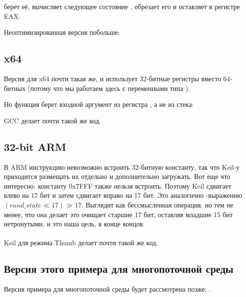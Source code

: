  берет её, вычисляет следующее состояние , 
обрезает его и оставляет в регистре EAX.

Неоптимизированная версия побольше:



\subsection{x64}

Версия для x64 почти такая же, и использует 32-битные регистры вместо 64-битных
(потому что мы работаем здесь с переменными типа \Tint).

Но функция  берет входной аргумент из регистра \ECX, а не из стека:



GCC делает почти такой же код.

\subsection{32-bit ARM}



В ARM инструкцию невозможно встроить 32-битную константу, так что Keil-у приходится размещать их отдельно и дополнительно загружать.
Вот еще что интересно: константу 0x7FFF также нельзя встроить.
Поэтому Keil сдвигает  влево на 17 бит и затем сдвигает вправо на 17 бит.
Это аналогично \CCpp{}-выражению $(rand\_state \ll 17) \gg 17$.
Выглядит как бессмысленная операция, но тем не менее, что она делает это очищает старшие 17 бит, оставляя младшие 15 бит нетронутыми, и это наша цель, в конце концов. \\
\\
\Optimizing Keil для режима Thumb делает почти такой же код.



\subsection{Версия этого примера для многопоточной среды}

Версия примера для многопоточной среды будет рассмотрена позже: .

